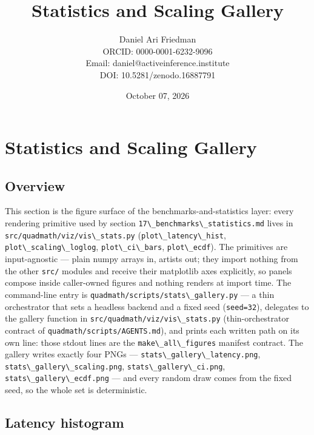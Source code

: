 \documentclass[
  10pt,
]{article}
\title{Statistics and Scaling Gallery}
\author{Daniel Ari Friedman\\ ORCID: 0000-0001-6232-9096\\ Email: daniel@activeinference.institute\\ DOI: 10.5281/zenodo.16887791}
\date{October 07, 2026}
\newcommand{\passthrough}[1]{#1}
\begin{document}
\maketitle

{
\hypersetup{linkcolor=black}
\setcounter{tocdepth}{3}
\tableofcontents
}
\section{Statistics and Scaling
Gallery}\label{statistics-and-scaling-gallery}

\subsection{Overview}\label{overview}

This section is the figure surface of the benchmarks-and-statistics
layer: every rendering primitive used by section
\passthrough{\lstinline!17\_benchmarks\_statistics.md!} lives in
\passthrough{\lstinline!src/quadmath/viz/vis\_stats.py!}
(\passthrough{\lstinline!plot\_latency\_hist!},
\passthrough{\lstinline!plot\_scaling\_loglog!},
\passthrough{\lstinline!plot\_ci\_bars!},
\passthrough{\lstinline!plot\_ecdf!}). The primitives are input-agnostic
--- plain numpy arrays in, artists out; they import nothing from the
other \passthrough{\lstinline!src/!} modules and receive their
matplotlib axes explicitly, so panels compose inside caller-owned
figures and nothing renders at import time. The command-line entry is
\passthrough{\lstinline!quadmath/scripts/stats\_gallery.py!} --- a thin
orchestrator that sets a headless backend and a fixed seed
(\passthrough{\lstinline!seed=32!}), delegates to the gallery function
in \passthrough{\lstinline!src/quadmath/viz/vis\_stats.py!}
(thin-orchestrator contract of
\passthrough{\lstinline!quadmath/scripts/AGENTS.md!}), and prints each
written path on its own line: those stdout lines are the
\passthrough{\lstinline!make\_all\_figures!} manifest contract. The
gallery writes exactly four PNGs ---
\passthrough{\lstinline!stats\_gallery\_latency.png!},
\passthrough{\lstinline!stats\_gallery\_scaling.png!},
\passthrough{\lstinline!stats\_gallery\_ci.png!},
\passthrough{\lstinline!stats\_gallery\_ecdf.png!} --- and every random
draw comes from the fixed seed, so the whole set is deterministic.

\subsection{Latency histogram}\label{latency-histogram}
\end{document}
